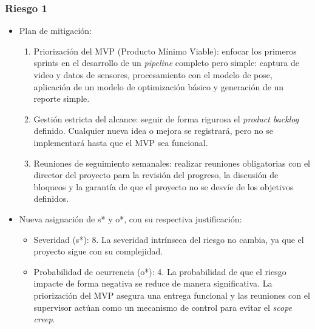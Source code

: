 \documentclass[
11pt, %
]{charter}
\begin{document}
\subsubsection*{Riesgo 1}
\begin{itemize}
    \item Plan de mitigación:
    \begin{enumerate}
      \item Priorización del MVP (Producto Mínimo Viable): enfocar los primeros sprints en el desarrollo de un \textit{pipeline} completo pero simple: captura de video y datos de sensores, procesamiento con el modelo de pose, aplicación de un modelo de optimización básico y generación de un reporte simple.
      \item Gestión estricta del alcance: seguir de forma rigurosa el \textit{product backlog} definido. Cualquier nueva idea o mejora se registrará, pero no se implementará hasta que el MVP sea funcional.
      \item Reuniones de seguimiento semanales: realizar reuniones obligatorias con el director del proyecto para la revisión del progreso, la discusión de bloqueos y la garantía de que el proyecto no se desvíe de los objetivos definidos.
    \end{enumerate}
  \item Nueva asignación de s* y o*, con su respectiva justificación:
  \begin{itemize}
  \item Severidad (s*): 8. La severidad intrínseca del riesgo no cambia, ya que el proyecto sigue con su complejidad.
  \item Probabilidad de ocurrencia (o*): 4. La probabilidad de que el riesgo impacte de forma negativa se reduce de manera significativa. La priorización del MVP asegura una entrega funcional y las reuniones con el supervisor actúan como un mecanismo de control para evitar el \textit{scope creep}.
  \end{itemize}
\end{itemize}
\end{document}
